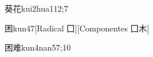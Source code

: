 \begin{verbete}{葵花}{kui2hua1}{12;7}
\end{verbete}

\begin{verbete}{困}{kun4}{7}[Radical ⼞][Componentes 囗木]
\end{verbete}

\begin{verbete}{困难}{kun4nan5}{7;10}
\end{verbete}

